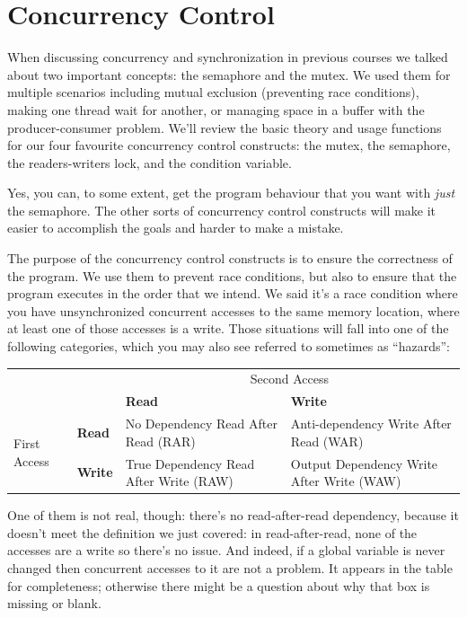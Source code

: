 




\section*{Concurrency Control}

When discussing concurrency and synchronization in previous courses we talked about two important concepts: the semaphore and the mutex. We used them for multiple scenarios including mutual exclusion (preventing race conditions), making one thread wait for another, or managing space in a buffer with the producer-consumer problem. We'll review the basic theory and usage functions for our four favourite concurrency control constructs: the mutex, the semaphore, the readers-writers lock, and the condition variable.

Yes, you can, to some extent, get the program behaviour that you want with \textit{just} the semaphore. The other sorts of concurrency control constructs will make it easier to accomplish the goals and harder to make a mistake.

The purpose of the concurrency control constructs is to ensure the correctness of the program. We use them to prevent race conditions, but also to ensure that the program executes in the order that we intend. We said it's a race condition where you have unsynchronized concurrent accesses to the same memory location, where at least one of those accesses is a write. Those situations will fall into one of the following categories, which you may also see referred to sometimes as ``hazards'':

\begin{tabular}{ll|l|l}
& & \multicolumn{2}{c}{Second Access} \\ 
&  & \bf Read & \bf Write \\ \hline
\multirow{2}{*}{First Access} & \bf Read & No Dependency Read After Read (RAR)  & Anti-dependency Write After Read (WAR) \\[0.5em]
& \bf Write & True Dependency Read After Write (RAW) & Output Dependency Write After Write (WAW) \\
\end{tabular}

One of them is not real, though: there's no read-after-read dependency, because it doesn't meet the definition we just covered: in read-after-read, none of the accesses are a write so there's no issue. And indeed, if a global variable is never changed then concurrent accesses to it are not a problem. It appears in the table for completeness; otherwise there might be a question about why that box is missing or blank.

